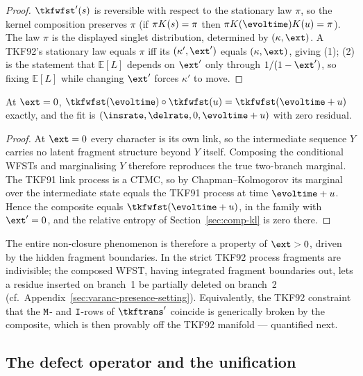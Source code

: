 \begin{proof}
$\tkfwfst'(s)$ is reversible with respect to the stationary law $\pi$, so
the kernel composition preserves $\pi$ (if $\pi K(s)=\pi$ then
$\pi\obskern(\evoltime)\obskern(\evolu)=\pi$).  The law $\pi$ is the
displayed singlet distribution, determined by $(\kappa,\ext)$.  A TKF92's
stationary law equals $\pi$ iff its $(\kappa',\ext')$ equals $(\kappa,\ext)$,
giving (1); (2) is the statement that $\mathbb{E}[L]$ depends on $\ext'$
only through $1/(1-\ext')$, so fixing $\mathbb{E}[L]$ while changing $\ext'$
forces $\kappa'$ to move.
\end{proof}

\begin{proposition}
\label{prop:tkf91-closed}
At $\ext = 0$,
$\tkfwfst(\evoltime)\circ\tkfwfst(\evolu) = \tkfwfst(\evoltime+\evolu)$
exactly, and the fit is $(\insrate,\delrate,0,\evoltime+\evolu)$ with zero
residual.
\end{proposition}

\begin{proof}
At $\ext=0$ every character is its own link, so the intermediate sequence
$Y$ carries no latent fragment structure beyond $Y$ itself.  Composing the
conditional WFSTs and marginalising $Y$ therefore reproduces the true
two-branch marginal.  The TKF91 link process is a CTMC, so by
Chapman--Kolmogorov its marginal over the intermediate state equals the
TKF91 process at time $\evoltime+\evolu$.  Hence the composite equals
$\tkfwfst(\evoltime+\evolu)$, in the family with $\ext'=0$, and the
relative entropy of Section~\ref{sec:comp-kl} is zero there.
\end{proof}

The entire non-closure phenomenon is therefore a property of $\ext>0$,
driven by the hidden fragment boundaries.  In the strict TKF92 process
fragments are indivisible; the composed WFST, having integrated fragment
boundaries out, lets a residue inserted on branch~1 be partially deleted on
branch~2 (cf.\ Appendix~\ref{sec:varanc-presence-setting}).  Equivalently,
the TKF92 constraint that the $\mathtt{M}$- and $\mathtt{I}$-rows of $\tkftrans'$
coincide is generically broken by the composite, which is then provably
off the TKF92 manifold --- quantified next.

\subsection{The defect operator and the unification}
\label{sec:comp-defect}

